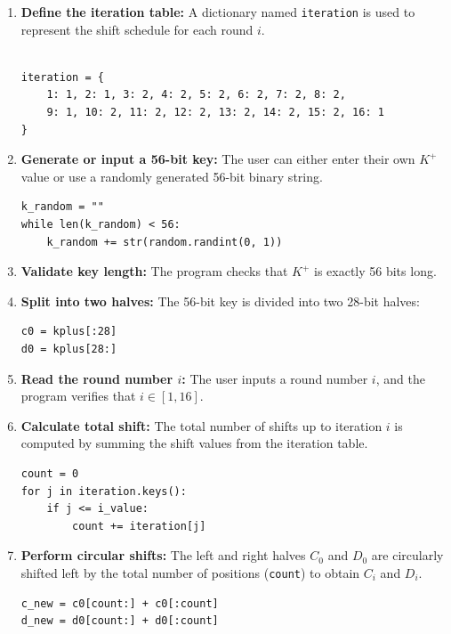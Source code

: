 \documentclass[12pt]{article}
\begin{document}
\begin{enumerate}
    \item \textbf{Define the iteration table:}  
    A dictionary named \texttt{iteration} is used to represent the shift schedule for each round \( i \).


\begin{verbatim}
    
iteration = {
    1: 1, 2: 1, 3: 2, 4: 2, 5: 2, 6: 2, 7: 2, 8: 2,
    9: 1, 10: 2, 11: 2, 12: 2, 13: 2, 14: 2, 15: 2, 16: 1
}
\end{verbatim}

    \item \textbf{Generate or input a 56-bit key:}  
    The user can either enter their own \( K^{+} \) value or use a randomly generated 56-bit binary string.
\begin{verbatim}
k_random = ""
while len(k_random) < 56:
    k_random += str(random.randint(0, 1))
\end{verbatim}

    \item \textbf{Validate key length:}  
    The program checks that \( K^{+} \) is exactly 56 bits long.

    \item \textbf{Split into two halves:}  
    The 56-bit key is divided into two 28-bit halves:
\begin{verbatim}
c0 = kplus[:28]
d0 = kplus[28:]
\end{verbatim}

    \item \textbf{Read the round number \( i \):}  
    The user inputs a round number \( i \), and the program verifies that \( i \in [1,16] \).

    \item \textbf{Calculate total shift:}  
    The total number of shifts up to iteration \( i \) is computed by summing the shift values from the iteration table.
\begin{verbatim}
count = 0
for j in iteration.keys():
    if j <= i_value:
        count += iteration[j]
\end{verbatim}

    \item \textbf{Perform circular shifts:}  
    The left and right halves \( C_0 \) and \( D_0 \) are circularly shifted left by the total number of positions (\texttt{count}) to obtain \( C_i \) and \( D_i \).
\begin{verbatim}
c_new = c0[count:] + c0[:count]
d_new = d0[count:] + d0[:count]
\end{verbatim}


\end{enumerate}
\end{document}
